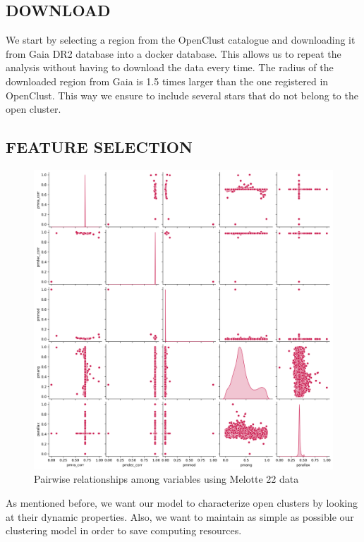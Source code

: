 \documentclass[11pt,a4paper,USenglish,twocolumn]{article}
\begin{document}
\subsection{DOWNLOAD}

We start by selecting a region from the OpenClust catalogue and downloading it from
Gaia DR2 database into a docker database. This allows us to repeat the analysis without
having to download the data every time. The radius of the downloaded region from Gaia
is 1.5 times larger than the one registered in OpenClust. This way we ensure to include
several stars that do not belong to the open cluster.

\subsection{FEATURE SELECTION}
\label{sec:feature_selection}

\begin{figure}[htbp]
  \includegraphics[width=\columnwidth]{../figures/melotte_22/features_melotte_22.png}
  \caption{Pairwise relationships among variables using Melotte 22 data}
  \label{fig:features_melotte_22}
\end{figure}

As mentioned before, we want our model to characterize open clusters by looking at
their dynamic properties. Also, we want to maintain as simple as possible our
clustering model in order to save computing resources.
\end{document}
